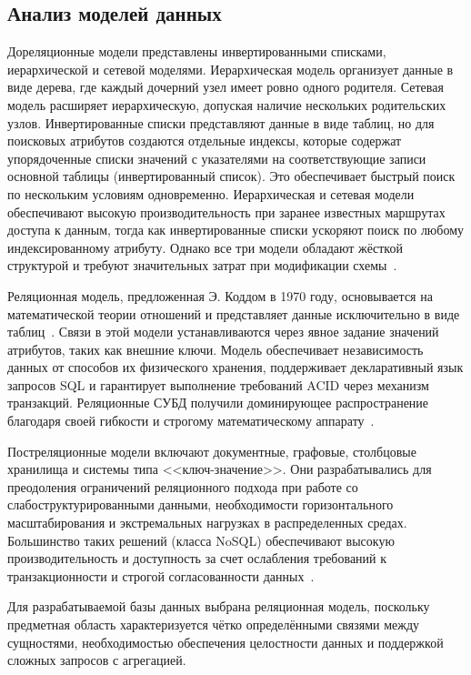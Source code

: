 \subsection{Анализ моделей данных}
Дореляционные модели представлены инвертированными списками, иерархической и сетевой моделями. Иерархическая модель организует данные в виде дерева, где каждый дочерний узел имеет ровно одного родителя. Сетевая модель расширяет иерархическую, допуская наличие нескольких родительских узлов. Инвертированные списки представляют данные в виде таблиц, но для поисковых атрибутов создаются отдельные индексы, которые содержат упорядоченные списки значений с указателями на соответствующие записи основной таблицы (инвертированный список). Это обеспечивает быстрый поиск по нескольким условиям одновременно. Иерархическая и сетевая модели обеспечивают высокую производительность
при заранее известных маршрутах доступа к данным, тогда как инвертированные списки ускоряют поиск по любому индексированному атрибуту. Однако все три модели обладают жёсткой структурой и требуют значительных затрат при модификации схемы~\cite{ref:models_db}.

Реляционная модель, предложенная Э. Коддом в 1970 году, основывается на математической теории отношений и представляет данные исключительно в виде таблиц~\cite{ref:models_db}. Связи в этой модели устанавливаются через явное задание значений атрибутов, таких как внешние ключи. Модель обеспечивает независимость данных от способов их физического хранения, поддерживает декларативный язык запросов SQL и гарантирует выполнение требований ACID через механизм транзакций. Реляционные СУБД получили доминирующее распространение благодаря своей гибкости и строгому математическому аппарату~\cite{ref:date_db}.

Постреляционные модели включают документные, графовые, столбцовые хранилища и системы типа <<ключ-значение>>. Они разрабатывались для преодоления ограничений реляционного подхода при работе со слабоструктурированными данными, необходимости горизонтального масштабирования и экстремальных нагрузках в распределенных средах. Большинство таких решений (класса NoSQL) обеспечивают высокую производительность и доступность за счет ослабления требований к транзакционности и строгой согласованности данных~\cite{ref:dbtech}.

Для разрабатываемой базы данных выбрана реляционная модель, поскольку
предметная область характеризуется чётко определёнными связями между
сущностями, необходимостью обеспечения целостности данных и поддержкой
сложных запросов с агрегацией.

